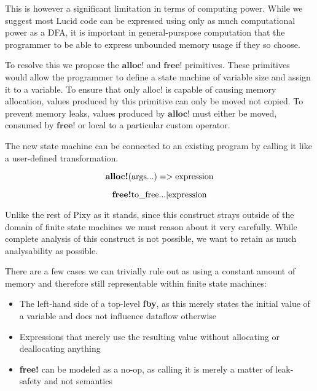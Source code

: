 \documentclass{scrartcl}
\begin{document}
    This is however a significant limitation in terms of computing power. While we suggest most Lucid code can be expressed using only as much computational power as a DFA, it is important in general-purspose computation that the programmer to be able to express unbounded memory usage if they so choose.
    
    To resolve this we propose the $\textbf{alloc!}$ and $\textbf{free!}$ primitives. These primitives would allow the programmer to define a state machine of variable size and assign it to a variable. To ensure that only alloc! is capable of causing memory allocation, values produced by this primitive can only be moved not copied. To prevent memory leaks, values produced by $\textbf{alloc!}$ must either be moved, consumed by $\textbf{free!}$ or local to a particular custom operator.
    
    The new state machine can be connected to an existing program by calling it like a user-defined transformation.
    
    \begin{equation}
    \textbf{alloc!} (\textnormal{args}...) => \textnormal{expression}
    \end{equation}
    
    \begin{equation}    
    \textbf{free!} \textnormal{to\_free}... | \textnormal{expression}
    \end{equation}
    
    Unlike the rest of Pixy as it stands, since this construct strays outside of the domain of finite state machines we must reason about it very carefully. While complete analysis of this construct is not possible, we want to retain as much analysability as possible.
    
    There are a few cases we can trivially rule out as using a constant amount of memory and therefore still representable within finite state machines:
    \begin{itemize}
        \item The left-hand side of a top-level \textbf{fby}, as this merely states the initial value of a variable and does not influence dataflow otherwise
        \item Expressions that merely use the resulting value without allocating or deallocating anything
        \item \textbf{free!} can be modeled as a no-op, as calling it is merely a matter of leak-safety and not semantics
    \end{itemize}
    
\end{document}
